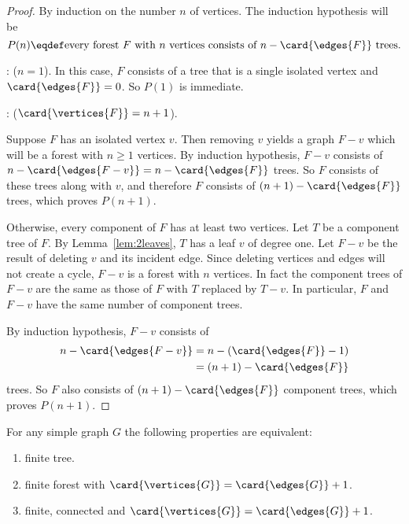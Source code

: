 \begin{proof}
By induction on the number $n$ of vertices.  The induction hypothesis
will be
\[
P(n) \eqdef \text{every forest $F$ with $n$ vertices consists of $n -
  \card{\edges{F}}$ trees}.
\]

: ($n=1$).  In this case, $F$ consists of a
tree that is a single isolated vertex and $\card{\edges{F}} = 0$.  So
$P(1)$ is immediate.

: ($\card{\vertices{F}} = n+1$).

Suppose $F$ has an isolated vertex $v$.  Then removing $v$ yields a
graph $F-v$ which will be a forest with $n \geq 1$ vertices.  By
induction hypothesis, $F-v$ consists of $n - \card{\edges{F-v}} = n-
\card{\edges{F}}$ trees.  So $F$ consists of these trees along with
$v$, and therefore $F$ consists of $(n+1) - \card{\edges{F}}$ trees,
which proves $P(n+1)$.

Otherwise, every component of $F$ has at least two vertices.  Let $T$
be a component tree of $F$.  By Lemma~\ref{lem:2leaves}, $T$ has a
leaf $v$ of degree one.  Let $F-v$ be the result of deleting $v$ and
its incident edge.  Since deleting vertices and edges will not create
a cycle, $F-v$ is a forest with $n$ vertices.  In fact the component
trees of $F-v$ are the same as those of $F$ with $T$ replaced by
$T-v$.  In particular, $F$ and $F-v$ have the same number of component
trees.

By induction hypothesis, $F-v$ consists of
\begin{align*}
n - \card{\edges{F-v}}
   & = n- (\card{\edges{F}}-1)\\
   & = (n+1) - \card{\edges{F}}
\end{align*}
trees.  So $F$ also consists of $(n+1) - \card{\edges{F}}$ component
trees, which proves $P(n+1)$.
\end{proof}

\begin{theorem}\label{thm:iffe=v-1}
For any simple graph $G$ the following properties are equivalent:
\end{theorem}

\begin{enumerate}[(1)]
\item\label{itm:fintree} finite tree.

\item\label{itm:finacyc} finite forest with $\card{\vertices{G}} = \card{\edges{G}} +1$.

\item\label{itm:finconn} finite, connected and $\card{\vertices{G}} = \card{\edges{G}} +1$.
\end{enumerate}

